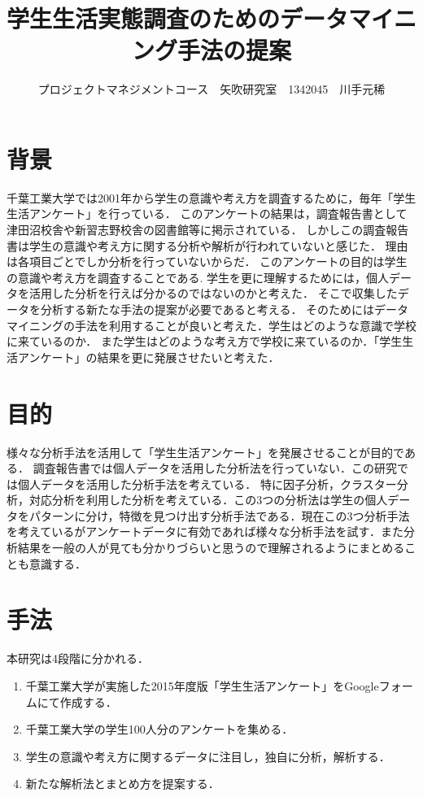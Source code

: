 \documentclass[uplatex,twocolumn,dvipdfmx]{jsarticle}
\title{\vspace{-5mm}\fontsize{14pt}{0pt}\selectfont 学生生活実態調査のためのデータマイニング手法の提案}
\author{\normalsize プロジェクトマネジメントコース　矢吹研究室　1342045　川手元稀}
\date{}
\begin{document}
\fontsize{10.5pt}{\baselineskip}\selectfont
\maketitle





\section{背景}
千葉工業大学では2001年から学生の意識や考え方を調査するために，毎年「学生生活アンケート」を行っている．
このアンケートの結果は，調査報告書として津田沼校舎や新習志野校舎の図書館等に掲示されている．
しかしこの調査報告書は学生の意識や考え方に関する分析や解析が行われていないと感じた．
理由は各項目ごとでしか分析を行っていないからだ．
このアンケートの目的は学生の意識や考え方を調査することである\cite{a}.
学生を更に理解するためには，個人データを活用した分析を行えば分かるのではないのかと考えた．
そこで収集したデータを分析する新たな手法の提案が必要であると考える．
そのためにはデータマイニングの手法を利用することが良いと考えた．学生はどのような意識で学校に来ているのか．
また学生はどのような考え方で学校に来ているのか．「学生生活アンケート」の結果を更に発展させたいと考えた．


\section{目的}
様々な分析手法を活用して「学生生活アンケート」を発展させることが目的である．
調査報告書では個人データを活用した分析法を行っていない．この研究では個人データを活用した分析手法を考えている．
特に因子分析，クラスター分析，対応分析を利用した分析を考えている．この3つの分析法は学生の個人データをパターンに分け，特徴を見つけ出す分析手法である\cite{b}．現在この3つ分析手法を考えているがアンケートデータに有効であれば様々な分析手法を試す．また分析結果を一般の人が見ても分かりづらいと思うので理解されるようにまとめることも意識する．


\section{手法}
本研究は4段階に分かれる．

\begin{enumerate}
\item 千葉工業大学が実施した2015年度版「学生生活アンケート」をGoogleフォームにて作成する．
\item 千葉工業大学の学生100人分のアンケートを集める．
\item 学生の意識や考え方に関するデータに注目し，独自に分析，解析する．
\item 新たな解析法とまとめ方を提案する．
\end{enumerate}
\end{document}
